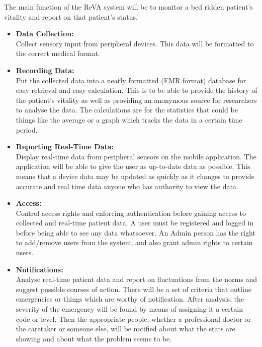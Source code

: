 The main function of the ReVA system will be to monitor a bed ridden patient's vitality and report on that patient's status.
\begin{itemize}

\item \textbf{Data Collection:}\\
Collect sensory input from peripheral devices. This data will be formatted to the correct medical format. 

\item \textbf{Recording Data:}\\
Put the collected data into a neatly formatted (EMR format) database for easy retrieval and easy calculation. This is to be able to provide the history of the patient's vitality as well as providing an anonymous source for researchers to analyse the data. The calculations are for the statistics that could be things like the average or a graph which tracks the data in a certain time period.

\item \textbf{Reporting Real-Time Data:}\\
Display real-time data from peripheral sensors on the mobile application. The application will be able to give the user as up-to-date data as possible. This means that a device data may be updated as quickly as it changes to provide accurate and real time data anyone who has authority to view the data.

\item \textbf{Access:}\\
Control access rights and enforcing authentication before gaining access to collected and real-time patient data. A user must be registered and logged in before being able to see any data whatsoever. An Admin person has the right to add/remove users from the system, and also grant admin rights to certain users.
 
\item \textbf{Notifications:}\\
Analyse real-time patient data and report on fluctuations from the norms and suggest possible courses of action. There will be a set of criteria that outline emergencies or things which are worthy of notification. After analysis, the severity of the emergency will be found by means of assigning it a certain code or level. Then the appropriate people, whether a professional doctor or the caretaker or someone else, will be notified about what the stats are showing and about what the problem seems to be.
\end{itemize}